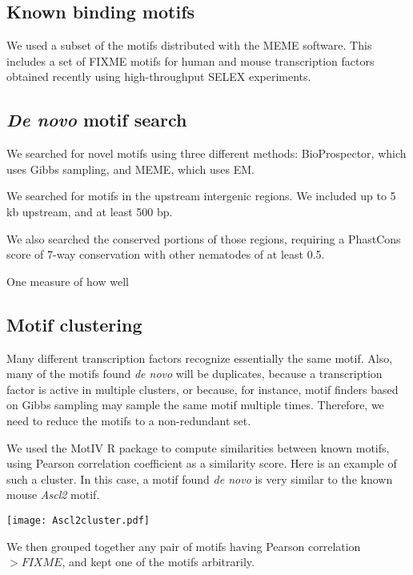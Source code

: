 \documentclass{article}
\begin{document}
\subsection*{Known binding motifs}

We used a subset of the motifs distributed with the MEME software.
This includes a set of FIXME motifs for human and mouse transcription
factors obtained recently using
high-throughput SELEX experiments.




\subsection*{{\em De novo} motif search}

We searched for novel motifs using three different methods:
BioProspector, which uses Gibbs sampling, and MEME, which uses EM.

We searched for motifs in the upstream intergenic regions.
We included
up to 5 kb upstream, and at least 500 bp.

We also searched the conserved portions of those regions,
requiring a PhastCons score of 7-way conservation with other nematodes
of at least 0.5.

One measure of how well



\subsection*{Motif clustering}

Many different transcription factors recognize essentially the same
motif. Also, many of the motifs found {\em de novo} will be duplicates,
because a transcription factor is active in multiple clusters, or because,
for instance, motif finders based on Gibbs sampling may sample the same
motif multiple times. Therefore, we need to reduce the motifs to a
non-redundant set.

We used the MotIV R package to compute similarities between known
motifs, using Pearson correlation coefficient as a similarity score.
Here is an example of such a cluster. In this case, a motif found
{\em de novo} is very similar to the known mouse {\em Ascl2} motif.

\begin{center}
\texttt{[image: Ascl2cluster.pdf]}
\end{center}


We then grouped together any pair of motifs having Pearson correlation
$ > FIXME$, and kept one of the motifs arbitrarily.
\end{document}
